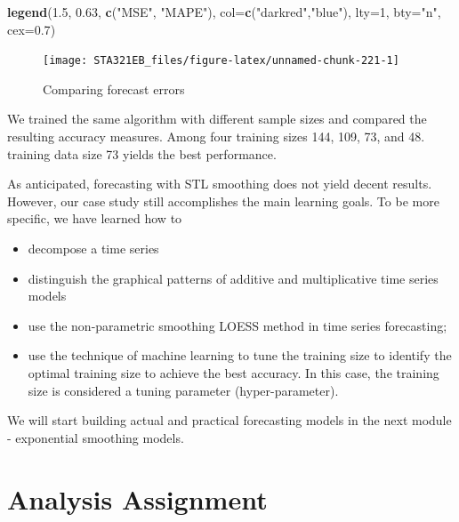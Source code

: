 \documentclass[
]{book}
\newenvironment{Shaded}{\begin{snugshade}}{\end{snugshade}}
\newcommand{\AttributeTok}[1]{\textcolor[rgb]{0.13,0.29,0.53}{#1}}
\newcommand{\DecValTok}[1]{\textcolor[rgb]{0.00,0.00,0.81}{#1}}
\newcommand{\FloatTok}[1]{\textcolor[rgb]{0.00,0.00,0.81}{#1}}
\newcommand{\FunctionTok}[1]{\textcolor[rgb]{0.13,0.29,0.53}{\textbf{#1}}}
\newcommand{\NormalTok}[1]{#1}
\newcommand{\StringTok}[1]{\textcolor[rgb]{0.31,0.60,0.02}{#1}}
\begin{document}
\begin{Shaded}
\begin{Highlighting}[]
\FunctionTok{legend}\NormalTok{(}\FloatTok{1.5}\NormalTok{, }\FloatTok{0.63}\NormalTok{, }\FunctionTok{c}\NormalTok{(}\StringTok{"MSE"}\NormalTok{, }\StringTok{"MAPE"}\NormalTok{), }\AttributeTok{col=}\FunctionTok{c}\NormalTok{(}\StringTok{"darkred"}\NormalTok{,}\StringTok{"blue"}\NormalTok{), }\AttributeTok{lty=}\DecValTok{1}\NormalTok{, }\AttributeTok{bty=}\StringTok{"n"}\NormalTok{, }\AttributeTok{cex=}\FloatTok{0.7}\NormalTok{)}
\end{Highlighting}
\end{Shaded}

\begin{figure}

{\centering \texttt{[image: STA321EB\_files/figure-latex/unnamed-chunk-221-1]} 

}

\caption{Comparing forecast errors}\label{fig:unnamed-chunk-221}
\end{figure}

We trained the same algorithm with different sample sizes and compared the resulting accuracy measures. Among four training sizes 144, 109, 73, and 48. training data size 73 yields the best performance.

As anticipated, forecasting with STL smoothing does not yield decent results. However, our case study still accomplishes the main learning goals. To be more specific, we have learned how to

\begin{itemize}
\item
  decompose a time series
\item
  distinguish the graphical patterns of additive and multiplicative time series models
\item
  use the non-parametric smoothing LOESS method in time series forecasting;
\item
  use the technique of machine learning to tune the training size to identify the optimal training size to achieve the best accuracy. In this case, the training size is considered a tuning parameter (hyper-parameter).
\end{itemize}

We will start building actual and practical forecasting models in the next module - exponential smoothing models.

\hypertarget{analysis-assignment-6}{%
\section{Analysis Assignment}\label{analysis-assignment-6}}
\end{document}
